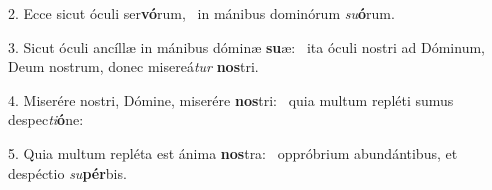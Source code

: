 2. Ecce sicut óculi ser\textbf{vó}rum, \ast\  in mánibus dominórum \textit{su}\textbf{ó}rum.\

3. Sicut óculi ancíllæ in mánibus dóminæ \textbf{su}æ: \ast\  ita óculi nostri ad Dóminum, Deum nostrum, donec misereá\textit{tur} \textbf{nos}tri.\

4. Miserére nostri, Dómine, miserére \textbf{nos}tri: \ast\  quia multum repléti sumus despec\textit{ti}\textbf{ó}ne:\

5. Quia multum repléta est ánima \textbf{nos}tra: \ast\  oppróbrium abundántibus, et despéctio \textit{su}\textbf{pér}bis.\

